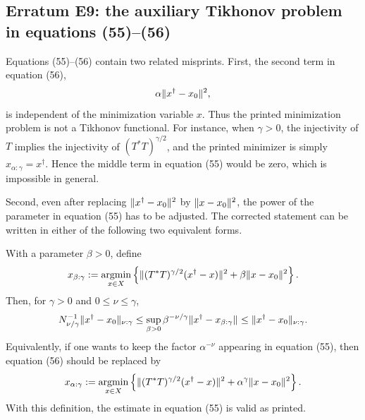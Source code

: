 
\subsection*{Erratum E9: the auxiliary Tikhonov problem in equations (55)--(56)}
\label{s:erratum:E9}

Equations (55)--(56) contain two related
misprints.  First, the second term in equation (56),
\[
        \alpha \| x^\dag - x_0 \|_{  }^2,
\]
is independent of the minimization variable $x$.  Thus the printed
minimization problem is not a Tikhonov functional.  For instance, when
$\gamma>0$, the injectivity of $T$ implies the injectivity of
$(T^*T)^{\gamma/2}$, and the printed minimizer is simply
$x_{\alpha:\gamma}=x^\dag$.  Hence the middle term in equation (55)
would be zero, which is impossible in general.

Second, even after replacing $\| x^\dag-x_0 \|_{  }^2$ by
$\| x-x_0 \|_{  }^2$, the power of the parameter in equation (55) has to
be adjusted.  The corrected statement can be written in either of the
following two equivalent forms.

With a parameter $\beta>0$, define
\begin{align}
\label{e:erratum:E9:xbeta}
        x_{\beta:\gamma}
        :=
        \mathop{\mathrm{argmin}}_{x\in X}
        \left\{
                \| (T^*T)^{\gamma/2}(x^\dag-x) \|_{  }^2
                +
                \beta \| x-x_0 \|_{  }^2
        \right\} .
\end{align}
Then, for $\gamma>0$ and $0\leq \nu\leq \gamma$,
\begin{align}
\label{e:erratum:E9:beta-estimate}
        N_{\nu/\gamma}^{-1}
        \| x^\dag-x_0 \|_{ \nu:\gamma }
        \leq
        \sup_{\beta>0}
        \beta^{-\nu/\gamma}
        \| x^\dag-x_{\beta:\gamma} \|_{  }
        \leq
        \| x^\dag-x_0 \|_{ \nu:\gamma } .
\end{align}
Equivalently, if one wants to keep the factor $\alpha^{-\nu}$ appearing in
equation (55), then equation (56) should be replaced by
\begin{align}
\label{e:erratum:E9:xalpha}
        x_{\alpha:\gamma}
        :=
        \mathop{\mathrm{argmin}}_{x\in X}
        \left\{
                \| (T^*T)^{\gamma/2}(x^\dag-x) \|_{  }^2
                +
                \alpha^\gamma \| x-x_0 \|_{  }^2
        \right\} .
\end{align}
With this definition, the estimate in equation (55) is valid as printed.

